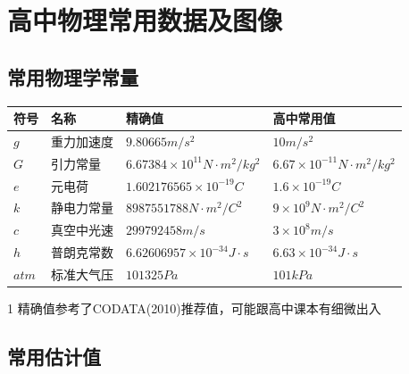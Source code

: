 
\chapter{高中物理常用数据及图像}

\section{常用物理学常量}

\begin{table}[h]
\centering
\begin{threeparttable}
\begin{tabular}{|l|l|l|l|}
\hline
\textbf{符号} & \textbf{名称} & \textbf{精确值}\tnote{1} & \textbf{高中常用值}\\
\hline
$g$ & 重力加速度 & $9.80665 m/s^2$ & $10m/s^2$ \\
$G$ & 引力常量 & $6.67384 \times 10^{11} N \cdot m^2/kg^2$ & $6.67 \times 10^{-11} N \cdot m^2/kg^2$ \\
$e$ & 元电荷 & $1.602176565 \times 10^{-19} C$ & $1.6 \times 10^{-19} C$ \\ 
$k$ &  静电力常量 & $8987551788 N \cdot m^2 / C^2$ & $9 \times 10^{9} N \cdot m^2 /C^2$ \\
$c$ & 真空中光速 & $299792458 m/s$ & $3 \times 10^{8} m/s$ \\
$h$ & 普朗克常数 & $6.62606957 \times 10^{-34} J \cdot s$ & $6.63 \times 10^{-34} J \cdot s$ \\
$atm$ & 标准大气压 & $101325 Pa$ & $101kPa$ \\
\hline
\end{tabular}
\begin{tablenotes}
\item[1] 精确值参考了CODATA(2010)推荐值，可能跟高中课本有细微出入
\end{tablenotes}
\end{threeparttable}
\end{table}

\section{常用估计值}

